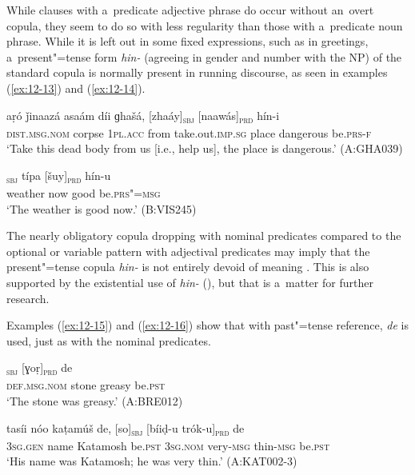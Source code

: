 While clauses with a~predicate adjective phrase do occur without an~overt copula, they seem to do so with less regularity than those with a~predicate noun phrase. While it is left out in some fixed expressions, such as in greetings, a~present"=tense form \textit{hin-} (agreeing in gender and number with the NP) of the standard copula is normally present in running discourse, as seen in examples (\ref{ex:12-13}) and (\ref{ex:12-14}). 

\begin{exe}
\ex
\label{ex:12-13}
\gll aṛó ǰinaazá asaám díi ɡhašá, [zhaáy]\textsubscript{\textsc{sbj}} [naawás]\textsubscript{\textsc{prd}} hín-i \\
\textsc{dist.msg.nom} corpse \textsc{1pl.acc} from take.out.\textsc{imp.sg}  place dangerous be.\textsc{prs-f} \\
\glt `Take this dead body from us [i.e., help us], the place is dangerous.' (A:GHA039)
\end{exe}
\begin{exe}
\ex
\label{ex:12-14}
\gll [moosúm]\textsubscript{\textsc{sbj}} típa [šuy]\textsubscript{\textsc{prd}} hín-u \\
weather now good be.\textsc{prs"=msg} \\
\glt `The weather is good now.' (B:VIS245)
\end{exe}

The nearly obligatory copula dropping with nominal predicates compared to the optional or variable pattern with adjectival predicates may imply that the present"=tense copula \textit{hin-} is not entirely devoid of meaning \citep[8, 31, 66]{pustet2003}. This is also supported by the existential use of \textit{hin-} (), but that is a~matter for further research.



Examples (\ref{ex:12-15}) and (\ref{ex:12-16}) show that with past"=tense reference, \textit{de} is used, just as with the nominal predicates.

\begin{exe}
\ex
\label{ex:12-15}
\gll [so báaṭ]\textsubscript{\textsc{sbj}} [ɣoṛ]\textsubscript{\textsc{prd}} de \\
\textsc{def.msg.nom} stone greasy be.\textsc{pst} \\
\glt `The stone was greasy.' (A:BRE012)
\end{exe}
\begin{exe}
\ex
\label{ex:12-16}
\gll tasíi nóo kaṭamúš de, [so]\textsubscript{\textsc{sbj}} [bíiḍ-u trók-u]\textsubscript{\textsc{prd}} de \\
\textsc{3sg.gen} name Katamosh be.\textsc{pst} \textsc{3sg.nom} very-\textsc{msg}  thin-\textsc{msg} be.\textsc{pst} \\
\glt `His name was Katamosh; he was very thin.' (A:KAT002-3)
\end{exe}

